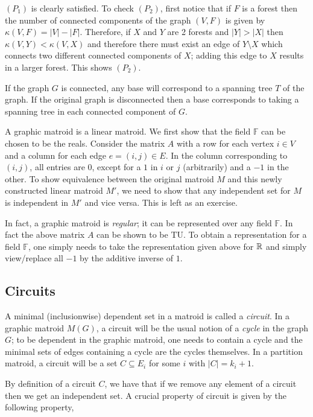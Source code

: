 \documentclass[12pt]{article}
\newcommand{\F}{{\mathbb F}}
\begin{document}
\begin{itemize}
$(P_1)$ is clearly satisfied. To check $(P_2)$, first notice that if
$F$ is a forest then the number of connected components of the graph
$(V,F)$ is given by $\kappa(V,F)=|V|-|F|$. Therefore, if $X$ and $Y$ are 2
forests and $|Y|>|X|$ then $\kappa(V,Y)<\kappa(V,X)$ and therefore there must
exist an edge of $Y\setminus X$ which connects two different
connected components of $X$; adding this edge to $X$ results in a larger
forest. This shows $(P_2)$. 

If the graph $G$ is connected, any base will correspond to a spanning
tree $T$ of the graph. If the original graph is disconnected then a
base corresponds to taking a spanning tree in each connected component
of $G$.   

A graphic matroid is a linear matroid. We first show that the field
$\F$ can be chosen to be the reals. Consider the matrix $A$ with a row
for each vertex $i\in V$ and a column for each edge $e=(i,j)\in E$. In
the column corresponding to $(i,j)$, all entries are 0, except for a
$1$ in $i$ or $j$ (arbitrarily) and a $-1$ in the other. To show
equivalence between the original matroid $M$ and this newly
constructed linear matroid $M'$, we need to show that any independent
set for $M$ is independent in $M'$ and vice versa.  
This is left as an exercise.

In fact, a graphic matroid is {\it regular}; it can be represented
over any field $\F$. In fact the above matrix $A$ can be shown to be
TU.  To obtain a representation for a field $\F$, one simply needs to
take the representation given above for ${\mathbb R}$ and simply view/replace
all $-1$ by the additive inverse of $1$.

\end{itemize}

\subsection{Circuits}
A minimal (inclusionwise) dependent set in a matroid is called a {\it
  circuit}. In a graphic matroid $M(G)$, a circuit will be the usual notion
of a {\it cycle} in the graph $G$; to be dependent in the graphic matroid,
one needs to contain a cycle and the minimal sets of edges containing
a cycle are the cycles themselves. In a partition matroid, a circuit
will be a set $C\subseteq E_i$ for some $i$ with $|C|=k_i+1$. 

By definition of a circuit $C$, we have that if we remove any element
of a circuit then we get an independent set. A crucial property of
circuit is given by the following property,
\end{document}
